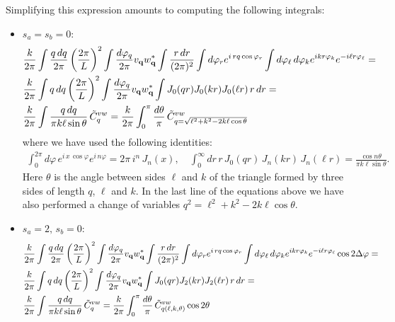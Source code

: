 \documentclass[a4paper,10pt]{article}
\begin{document}
    Simplifying this expression amounts to computing the following integrals:
    \begin{itemize}
     \item $s_a=s_b=0$:
       \begin{align}\nonumber
         &\frac{k}{2\pi}\int \frac{q\,dq}{2\pi}\left(\frac{2\pi}{L}\right)^2\int\frac{d\varphi_q}{2\pi}v_{\bf q}w^*_{\bf q}\int\frac{r\,dr}{(2\pi)^2}\int d\varphi_re^{i\,rq\cos\varphi_r}\int d\varphi_\ell\,d\varphi_ke^{ikr\varphi_k}e^{-i\ell r\varphi_\ell}=\\\nonumber
         &\frac{k}{2\pi}\int q\,dq\left(\frac{2\pi}{L}\right)^2\int\frac{d\varphi_q}{2\pi}v_{\bf q}w^*_{\bf q}\int J_0(qr)J_0(kr)J_0(\ell r)\,r\,dr=\\
         &\frac{k}{2\pi}\int \frac{q\,dq}{\pi k\ell\sin\theta}\,\tilde{C}^{vw}_q=\frac{k}{2\pi}\int_0^\pi \frac{d\theta}{\pi}\,\tilde{C}^{vw}_{q=\sqrt{\ell^2+k^2-2k\ell\cos\theta}}
       \end{align}
       where we have used the following identities:
       \begin{align}
         \int_0^{2\pi} d\varphi\,e^{i\,x\,\cos\varphi}e^{i\,n\varphi}=2\pi\,i^n\,J_n(x),
         \hspace{12pt}
         \int_0^\infty dr\,r\,J_0(qr)\,J_n(kr)\,J_n(\ell r)=\frac{\cos n\theta}{\pi k\ell\sin\theta}.
       \end{align}
       Here $\theta$ is the angle between sides $\ell$ and $k$ of the triangle formed by three sides of length $q$, $\ell$ and $k$. In the last line of the equations above we have also performed a change of variables $q^2=\ell^2+k^2-2k\ell\cos\theta$.
     \item $s_a=2,\,s_b=0$:
       \begin{align}\nonumber
         &\frac{k}{2\pi}\int \frac{q\,dq}{2\pi}\left(\frac{2\pi}{L}\right)^2\int\frac{d\varphi_q}{2\pi}v_{\bf q}w^*_{\bf q}\int\frac{r\,dr}{(2\pi)^2}\int d\varphi_re^{i\,rq\cos\varphi_r}\int d\varphi_\ell\,d\varphi_ke^{ikr\varphi_k}e^{-i\ell r\varphi_\ell}\cos2\Delta\varphi=\\\nonumber
         &\frac{k}{2\pi}\int q\,dq\left(\frac{2\pi}{L}\right)^2\int\frac{d\varphi_q}{2\pi}v_{\bf q}w^*_{\bf q}\int J_0(qr)J_2(kr)J_2(\ell r)\,r\,dr=\\
         &\frac{k}{2\pi}\int \frac{q\,dq}{\pi k\ell\sin\theta}\,\tilde{C}^{vw}_q=\frac{k}{2\pi}\int_0^\pi\frac{d\theta}{\pi}\,\tilde{C}^{vw}_{q(\ell,k,\theta)}\cos2\theta
       \end{align}
       \begin{align}

\end{align}
\end{itemize}
\end{document}
